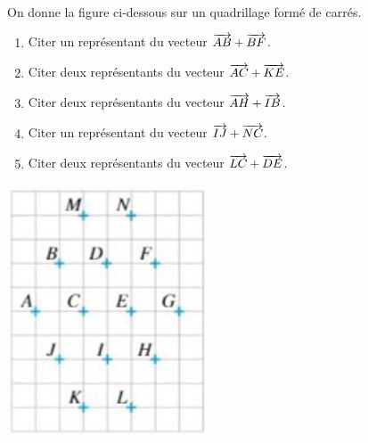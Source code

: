 \documentclass[11pt]{article}
\begin{document}
\begin{exo}~\\[-5mm]
  \begin{minipage}[]{.65\textwidth}
  On donne la figure ci-dessous sur un quadrillage formé de carrés.
    \begin{enumerate}
      \item Citer un représentant du vecteur $\overrightarrow{AB}+\overrightarrow{BF}$.
      \item Citer deux représentants du vecteur $\overrightarrow{AC}+\overrightarrow{KE}$.
      \item Citer deux représentants du vecteur $\overrightarrow{AH}+\overrightarrow{IB}$.
      \item Citer un représentant du vecteur $\overrightarrow{IJ}+\overrightarrow{NC}$.
      \item Citer deux représentants du vecteur $\overrightarrow{LC}+\overrightarrow{DE}$.
    \end{enumerate}
  \end{minipage}
  \begin{minipage}[]{.35\textwidth}
    \begin{center}
      \includegraphics[scale=.5]{quad3.png}
    \end{center}
  \end{minipage}
\end{exo}
\end{document}
